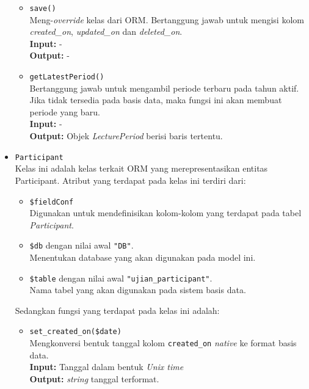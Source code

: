 \begin{itemize}
\begin{itemize}
                \item \texttt{save()}\\
                    Meng-\textit{override} kelas dari ORM. Bertanggung jawab
                    untuk mengisi kolom \textit{created\_on},
                    \textit{updated\_on} dan \textit{deleted\_on}.\\
                    \textbf{Input:} -\\
                    \textbf{Output:} -
                    
                \item \texttt{getLatestPeriod()}\\
                    Bertanggung jawab untuk mengambil periode terbaru pada tahun
                    aktif. Jika tidak tersedia pada basis data, maka fungsi ini
                    akan membuat periode yang baru.\\
                    \textbf{Input:} -\\
                    \textbf{Output:} Objek \textit{LecturePeriod} berisi baris
                    tertentu.
            \end{itemize}
            
        \item \texttt{Participant} \\
            Kelas ini adalah kelas terkait ORM yang merepresentasikan entitas
            Participant. Atribut yang terdapat pada kelas ini terdiri dari:
            \begin{itemize}
                \item \texttt{\$fieldConf} \\
                    Digunakan untuk mendefinisikan kolom-kolom yang terdapat
                    pada tabel \textit{Participant}.
                \item \texttt{\$db} dengan nilai awal \texttt{"DB"}. \\
                    Menentukan database yang akan digunakan pada model ini.
                \item \texttt{\$table} dengan nilai awal
                \texttt{"ujian\_participant"}. \\
                    Nama tabel yang akan digunakan pada sistem basis data. 
            \end{itemize}
            Sedangkan fungsi yang terdapat pada kelas ini adalah:
            \begin{itemize}
                \item \texttt{set\_created\_on(\$date)} \\
                    Mengkonversi bentuk tanggal kolom \texttt{created\_on}
                    \textit{native} ke format basis data. \\
                    \textbf{Input:} Tanggal dalam bentuk \textit{Unix time}\\
                    \textbf{Output:} \textit{string} tanggal terformat.
                

\end{itemize}
\end{itemize}
